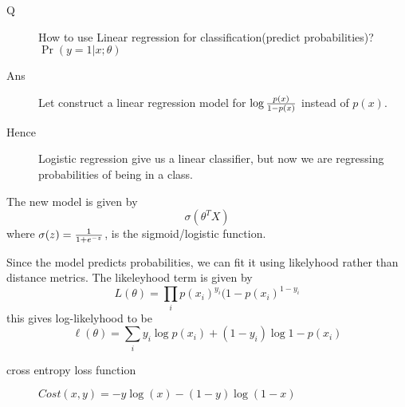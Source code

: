\begin{slide}
	\begin{description}
		\item[Q] How to use Linear regression for classification(predict probabilities)? $\Pr(y=1|x;\theta)$
		\item[Ans] Let construct a linear regression model for $\log{p(x)\over 1-p(x)}$ instead of $p(x)$.
		\item[Hence] Logistic regression give us a linear classifier, but now we are regressing probabilities of being in a class.
	\end{description}
	
	The new model is given by  $$\sigma(\theta^TX)$$ where $\sigma(z) = {1\over 1+e^{-z}}$, is the sigmoid/logistic function.
\end{slide}

\begin{slide}
	Since the model predicts probabilities, we can fit it using likelyhood rather than distance metrics. The likeleyhood term is given by
	$$L(\theta) = \prod_i p(x_i)^{y_i}(1-p(x_i)^{1-y_i}$$
	this gives log-likelyhood to be
	$$\ell(\theta) = \sum_iy_i\log p(x_i) + (1-y_i) \log 1-p(x_i)$$
	
	\begin{description}\item[cross entropy loss function] $Cost(x,y) = -y\log(x) -(1-y)\log(1-x)$\end{description}

\end{slide}
